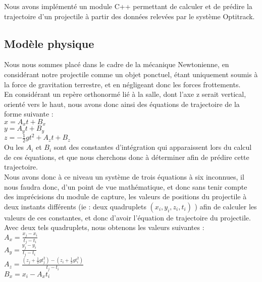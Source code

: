 Nous avons implémenté un module C++ permettant de calculer et de prédire la trajectoire d'un projectile à partir des données relevées par le système Optitrack.

\subsection{Modèle physique}

Nous nous sommes placé dans le cadre de la mécanique Newtonienne, en considérant notre projectile comme un objet ponctuel, étant uniquement soumis à la force de gravitation terrestre, et en négligeant donc les forces frottements.\\

En considérant un repère orthonormé lié à la salle, dont l'axe z serait vertical, orienté vers le haut, nous avons donc ainsi des équations de trajectoire de la forme suivante :\\

$x = A_xt + B_x$\\

$y = A_yt + B_y$\\

$z = -\frac{1}{2} g t^2 + A_zt + B_z$\\

Ou les $A_i$ et $B_i$ sont des constantes d'intégration qui apparaissent lors du calcul de ces équations, et que nous cherchons donc à déterminer afin de prédire cette trajectoire.\\

Nous avons donc à ce niveau un système de trois équations à six inconnues, il nous faudra donc, d'un point de vue mathématique, et donc sans tenir compte des imprécisions du module de capture, les valeurs de positions du projectile à deux instants différents (ie : deux quadruplets $(x_i, y_i, z_i, t_i)$ ) afin de calculer les valeurs de ces constantes, et donc d'avoir l'équation de trajectoire du projectile. Avec deux tels quadruplets, nous obtenons les valeurs suivantes :\\

$A_x = \frac{x_j-x_i}{t_j-t_i}$\\

$A_y = \frac{y_j-y_i}{t_j-t_i}$\\

$A_z = \frac{(z_j + \frac{1}{2} g t_j^2)-(z_i + \frac{1}{2} g t_i^2)}{t_j-t_i}$\\

$B_x = x_i - A_x t_i$\\

